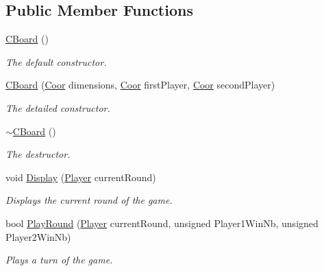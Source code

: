 \subsection*{Public Member Functions}
\begin{DoxyCompactItemize}
\item 
\hyperlink{class_c_board_a8898bd3c57e6e91db7769a378cb3b755}{C\-Board} ()
\begin{DoxyCompactList}\small\item\em The default constructor. \end{DoxyCompactList}\item 
\hyperlink{class_c_board_a2e77f37bac4646bcf1dd6e5f24582392}{C\-Board} (\hyperlink{common_8hpp_af5a69199868671fc85779715443d7e7d}{Coor} dimensions, \hyperlink{common_8hpp_af5a69199868671fc85779715443d7e7d}{Coor} first\-Player, \hyperlink{common_8hpp_af5a69199868671fc85779715443d7e7d}{Coor} second\-Player)
\begin{DoxyCompactList}\small\item\em The detailed constructor. \end{DoxyCompactList}\item 
\hyperlink{class_c_board_a28ed0237ed02ccd928a78a7f883eb110}{$\sim$\-C\-Board} ()
\begin{DoxyCompactList}\small\item\em The destructor. \end{DoxyCompactList}\item 
void \hyperlink{class_c_board_aba95815fd50be1fe6d6c922e9c49c91c}{Display} (\hyperlink{common_8hpp_a3b27da0d46d4c36bc71511bcea2db296}{Player} current\-Round)
\begin{DoxyCompactList}\small\item\em Displays the current round of the game. \end{DoxyCompactList}\item 
bool \hyperlink{class_c_board_a9b825449509fa118303842731dde17ff}{Play\-Round} (\hyperlink{common_8hpp_a3b27da0d46d4c36bc71511bcea2db296}{Player} current\-Round, unsigned Player1\-Win\-Nb, unsigned Player2\-Win\-Nb)
\begin{DoxyCompactList}\small\item\em Plays a turn of the game. \end{DoxyCompactList}\end{DoxyCompactItemize}
